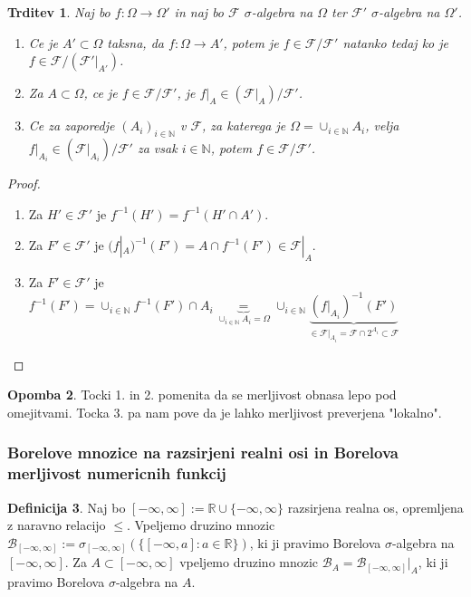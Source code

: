 \documentclass[a4paper,12pt]{article}
\theoremstyle{definition} %
\newtheorem{definicija}{Definicija}[section]
\newtheorem{opomba}[definicija]{Opomba}
\theoremstyle{plain} %
\newtheorem{trditev}[definicija]{Trditev}
\newcommand{\R}{\mathbb{R}}
\newcommand{\N}{\mathbb{N}}
\newcommand{\F}{\mathcal{F}}
\begin{document}
            \begin{trditev}
                Naj bo $f:\Omega \rightarrow \Omega'$ in naj bo $\F$ $\sigma$-algebra na $\Omega$ ter $\F'$ $\sigma$-algebra na $\Omega'$.
                \begin{enumerate}
                    \item Ce je $A' \subset \Omega$ taksna, da $f:\Omega \rightarrow A'$, potem je $f \in \F/\F'$ natanko tedaj ko je $f \in \F/(\F'|_{A'})$.
                    \item Za $A \subset \Omega$, ce je $f \in \F/\F'$, je $f|_{A} \in (\F|_A)/\F'$.
                    \item Ce za zaporedje $(A_i)_{i \in \N}$ v $\F$, za katerega je $\Omega = \cup_{i \in \N}A_i$, velja $f|_{A_{i}} \in (\F|_{A_{i}})/\F'$ za vsak $i \in \N$, potem $f \in \F/\F'$.
                \end{enumerate}
            \end{trditev}

            \begin{proof}
                \begin{enumerate}
                    \item Za $H'\in \F'$ je $f^{-1}(H') = f^{-1}(H'\cap A').$
                    \item Za $F' \in \F'$ je $(f|_A)^{-1}(F') = A \cap f^{-1}(F') \in \F|_A$.
                    \item Za $F'\in \F'$ je $f^{-1}(F') = \cup_{i \in \N}f^{-1}(F')\cap A_i \underbrace{=}_{\cup_{i \in \N}A_i = \Omega} \cup_{i \in \N}\underbrace{(f|_{A_i})^{-1}(F')}_{\in \F|_{A_i} = \F\cap 2^{A_i} \subset \F}$
                \end{enumerate}
            \end{proof}

            \begin{opomba}
                Tocki 1. in 2. pomenita da se merljivost obnasa lepo pod omejitvami. Tocka 3. pa nam pove da je lahko merljivost preverjena "lokalno". 
            \end{opomba}

        \subsubsection{Borelove mnozice na razsirjeni realni osi in Borelova merljivost numericnih funkcij}   
            \begin{definicija}
                Naj bo $[-\infty, \infty] := \R \cup \{-\infty, \infty\}$ razsirjena realna os, opremljena z naravno relacijo $\leq$. Vpeljemo druzino mnozic $\mathcal{B}_{[-\infty, \infty]}:= \sigma_{[-\infty, \infty]}(\{[-\infty, a]:a \in \R\})$, ki ji pravimo Borelova $\sigma$-algebra na $[-\infty, \infty]$. Za $A \subset [-\infty, \infty]$ vpeljemo druzino mnozic $\mathcal{B}_A = \mathcal{B}_{[-\infty, \infty]}|_A$, ki ji pravimo Borelova $\sigma$-algebra na $A$. 
            \end{definicija}
\end{document}
